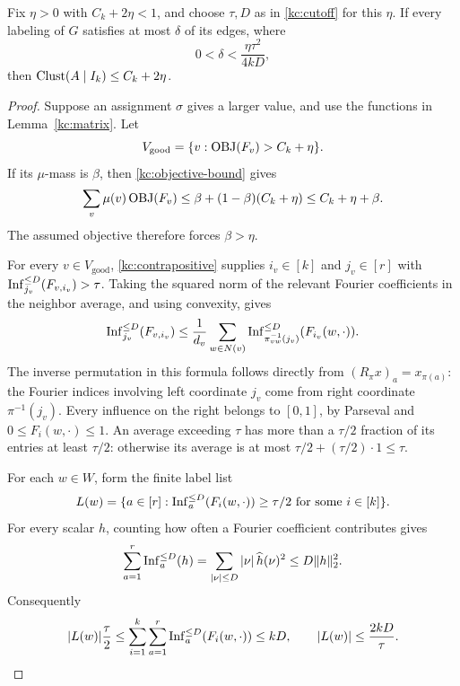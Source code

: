 \begin{lemma}[Soundness]\label{kc:soundness}
Fix \(\eta>0\) with \(C_k+2\eta<1\), and choose
\(\tau,D\) as in \eqref{kc:cutoff} for this \(\eta\).
If every labeling of \(G\) satisfies at most \(\delta\) of its
edges, where
\begin{equation}\label{kc:delta}
 0<\delta<\frac{\eta\tau^2}{4kD},
\end{equation}
then
\(\operatorname{Clust}(A\mid I_k)\le C_k+2\eta\).
\end{lemma}
\begin{proof}
Suppose an assignment \(\sigma\) gives a larger value, and use
the functions in Lemma~\ref{kc:matrix}.
Let
\[
 V_{\mathrm{good}}=
       \{v:\operatorname{OBJ}(F_v)>C_k+\eta\}.
\]
If its \(\mu\)-mass is \(\beta\), then
\eqref{kc:objective-bound} gives
\[
 \sum_v\mu(v)\operatorname{OBJ}(F_v)
 \le\beta+(1-\beta)(C_k+\eta)
 \le C_k+\eta+\beta.
\]
The assumed objective therefore forces \(\beta>\eta\).

For every \(v\in V_{\mathrm{good}}\),
\eqref{kc:contrapositive} supplies
\(i_v\in[k]\) and \(j_v\in[r]\) with
\(\operatorname{Inf}_{j_v}^{\le D}(F_{v,i_v})>\tau\).
Taking the squared norm of the relevant Fourier coefficients
in the neighbor average, and using convexity, gives
\begin{equation}\label{kc:influence-average}
 \operatorname{Inf}_{j_v}^{\le D}(F_{v,i_v})
 \le \frac1{d_v}\sum_{w\in N(v)}
       \operatorname{Inf}_{\pi_{vw}^{-1}(j_v)}^{\le D}(F_{i_v}(w,\cdot)).
\end{equation}
The inverse permutation in this formula follows directly from
\((R_\pi x)_a=x_{\pi(a)}\): the Fourier indices involving
left coordinate \(j_v\) come from right coordinate
\(\pi^{-1}(j_v)\).
Every influence on the right belongs to \([0,1]\), by
Parseval and \(0\le F_i(w,\cdot)\le1\).
An average exceeding \(\tau\) has more than a \(\tau/2\)
fraction of its entries at least \(\tau/2\):
otherwise its average is at most
\(\tau/2+(\tau/2)\cdot1\le\tau\).

For each \(w\in W\), form the finite label list
\[
 L(w)=
 \{a\in[r]:\operatorname{Inf}_a^{\le D}(F_i(w,\cdot))\ge\tau/2
                      \text{ for some }i\in[k]\}.
\]
For every scalar \(h\), counting how often a Fourier coefficient
contributes gives
\[
 \sum_{a=1}^r\operatorname{Inf}_a^{\le D}(h)
 =\sum_{|\nu|\le D}|\nu|\,\widehat h(\nu)^2
 \le D\|h\|_2^2.
\]
Consequently
\begin{equation}\label{kc:list-size}
 |L(w)|\frac{\tau}{2}
 \le\sum_{i=1}^k\sum_{a=1}^r
            \operatorname{Inf}_a^{\le D}(F_i(w,\cdot))
 \le kD,
 \qquad |L(w)|\le\frac{2kD}{\tau}.
\end{equation}


\end{proof}
